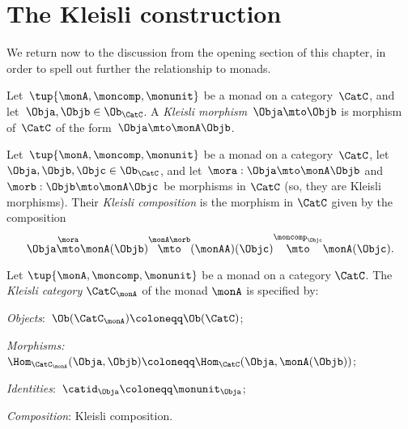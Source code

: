 

\section{The Kleisli construction}
\label{sec:Kleisli}

We return now to the discussion from the opening section of this chapter, in order to spell out further the relationship to monads. 


\begin{ctdefinition}
    \label{def:kleislimor}
Let~$\tup{\monA, \moncomp, \monunit}$ be a monad on a category~$\CatC$, and let~$\Obja, \Objb \in \Ob_\CatC$. A
\emph{Kleisli morphism}~$\Obja \mto \Objb$ is morphism of~$\CatC$ of the form~$\Obja \mto \monA \Objb$.
\end{ctdefinition}


\begin{ctdefinition}
    \label{def:kleislicomp}
Let~$\tup{\monA, \moncomp, \monunit}$ be a monad on a category~$\CatC$, let~$\Obja, \Objb, \Objc \in \Ob_\CatC$,  and let~$\mora : \Obja \mto \monA \Objb$ and $\morb : \Objb \mto \monA \Objc$ be morphisms in $\CatC$ (so, they are Kleisli morphisms). Their \emph{Kleisli composition} is the morphism in $\CatC$ given by the composition
\begin{equation}
\Obja \overset{\mora}{\mto} \monA(\Objb) \overset{\monA \morb}{\mto} (\monAA)(\Objc) \overset{\moncomp_\Objc}{\mto} \monA(\Objc).
\end{equation}
\end{ctdefinition}

\begin{ctdefinition}
    \label{def:kleislicat}
Let $\tup{\monA, \moncomp, \monunit}$ be a monad on a category $\CatC$. The \emph{Kleisli category} $\CatC_\monA$ of the monad $\monA$ is specified by:
\begin{compactenum}
\item \emph{Objects}:~$\Ob(\CatC_\monA) \coloneqq \Ob(\CatC)$;
\item \emph{Morphisms:}~$\Hom_{\CatC_\monA}(\Obja, \Objb) \coloneqq \Hom_{\CatC}(\Obja, \monA(\Objb))$;
\item \emph{Identities}:~$\catid_\Obja \coloneqq \monunit_\Obja$;
\item \emph{Composition}: Kleisli composition. 
\end{compactenum}
\end{ctdefinition}


